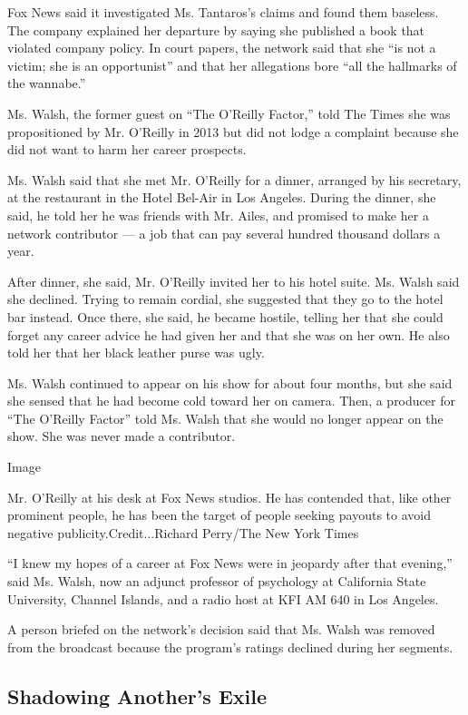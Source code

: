 Fox News said it investigated Ms. Tantaros's claims and found them
baseless. The company explained her departure by saying she published a
book that violated company policy. In court papers, the network said
that she ``is not a victim; she is an opportunist'' and that her
allegations bore ``all the hallmarks of the wannabe.''

Ms. Walsh, the former guest on ``The O'Reilly Factor,'' told The Times
she was propositioned by Mr. O'Reilly in 2013 but did not lodge a
complaint because she did not want to harm her career prospects.

Ms. Walsh said that she met Mr. O'Reilly for a dinner, arranged by his
secretary, at the restaurant in the Hotel Bel-Air in Los Angeles. During
the dinner, she said, he told her he was friends with Mr. Ailes, and
promised to make her a network contributor --- a job that can pay
several hundred thousand dollars a year.

After dinner, she said, Mr. O'Reilly invited her to his hotel suite. Ms.
Walsh said she declined. Trying to remain cordial, she suggested that
they go to the hotel bar instead. Once there, she said, he became
hostile, telling her that she could forget any career advice he had
given her and that she was on her own. He also told her that her black
leather purse was ugly.

Ms. Walsh continued to appear on his show for about four months, but she
said she sensed that he had become cold toward her on camera. Then, a
producer for ``The O'Reilly Factor'' told Ms. Walsh that she would no
longer appear on the show. She was never made a contributor.

Image

Mr. O'Reilly at his desk at Fox News studios. He has contended that,
like other prominent people, he has been the target of people seeking
payouts to avoid negative publicity.Credit...Richard Perry/The New York
Times

``I knew my hopes of a career at Fox News were in jeopardy after that
evening,'' said Ms. Walsh, now an adjunct professor of psychology at
California State University, Channel Islands, and a radio host at KFI AM
640 in Los Angeles.

A person briefed on the network's decision said that Ms. Walsh was
removed from the broadcast because the program's ratings declined during
her segments.

\hypertarget{shadowing-anothers-exile}{%
\subsection{Shadowing Another's Exile}\label{shadowing-anothers-exile}}

